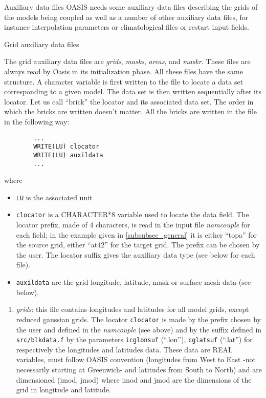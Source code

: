 \begin{subsection}{Auxiliary data files}
\label{subsec_data}
OASIS needs some auxiliary data files describing the grids of
the models being coupled as well as a number of other auxiliary data
files, for instance interpolation parameters or climatological files
or restart input fields.

\begin{subsubsection}{Grid auxiliary data files}
\label{subsub.gridauxdata}

The grid auxiliary data files are {\em grids}, {\em masks}, {\em
areas},  and {\em maskr}. These files are always read by Oasis in its 
initialization phase. All these files have the same structure. 
A character variable is first written
to the file to locate a data set corresponding to a given model.
The data set is then written sequentially after its locator. 
Let us call ``brick'' the locator and its associated data set.
The order in which the bricks are written doesn't matter. 
All the bricks are written in the file in the following way:

\begin{verbatim}
        ...
        WRITE(LU) clocator
        WRITE(LU) auxildata
        ...
\end{verbatim}
where
\begin{itemize}
\item {\tt LU} is the associated unit
\item {\tt clocator} is a CHARACTER*8 variable used to locate the data
field. The locator prefix, made of 4 characters, is read in the input
file {\em namcouple} for each field; in the example given in 
\ref{subsubsec_general} it is either ``topa'' for the source grid,
either ``at42'' for the target grid. The prefix can be chosen by the
user. The locator suffix gives the auxiliary data type (see below for
each file).
\item {\tt auxildata} are the grid longitude, latitude, mask or 
surface mesh data (see below).
\end{itemize}

\begin{enumerate}
\item {\em grids}: this file contains longitudes and latitudes for all
model grids, except reduced gaussian grids. The locator {\tt clocator}
is made by the prefix chosen by the user and defined in the 
{\em namcouple} (see above) and by the suffix defined in 
{\tt src/blkdata.f} by the
parameters {\tt icglonsuf} (``.lon''), {\tt cglatsuf} (``.lat'') for
respectively the longitudes and latitudes data. These data 
are REAL variables, must follow
OASIS convention (longitudes from West to East -not necessarily
starting at Greenwich- and latitudes from 
South to North) and are dimensioned (imod, jmod) where imod
and jmod are the dimensions of the grid in longitude and latitude.


\end{enumerate}
\end{subsubsection}
\end{subsection}
